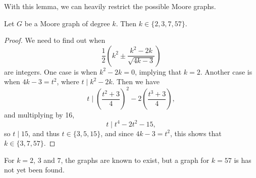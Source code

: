 \documentclass[a4paper]{scrartcl}
\begin{document}
With this lemma, we can heavily restrict the possible Moore graphs.

\begin{theorem}
	Let $G$ be a Moore graph of degree $k$. Then $k \in \{2, 3, 7, 57\}$.
\end{theorem}
\begin{proof}
	We need to find out when
	$$
	\frac{1}{2}\left(k^{2} \pm \frac{k^{2}-2 k}{\sqrt{4 k-3}}\right)
	$$
	are integers. One case is when $k^2 - 2k = 0$, implying that $k = 2$. Another case is when $4k - 3 = t^2$, where $t \mid k^2 - 2k$. Then we have
	$$
	t \mid\left(\frac{t^{2}+3}{4}\right)^{2}-2\left(\frac{t^{3}+3}{4}\right),
	$$
	and multiplying by 16,
	$$
	t \mid t^4 - 2t^2 - 15,
	$$
	so $t \mid 15$, and thus $t \in \{3, 5, 15\}$, and since $4k - 3 = t^2$, this shows that $k \in \{3, 7, 57\}$.
\end{proof}

\begin{remark}
	For $k = 2$, $3$ and $7$, the graphs are known to exist, but a graph for $k = 57$ is has not yet been found.
\end{remark}
\end{document}
